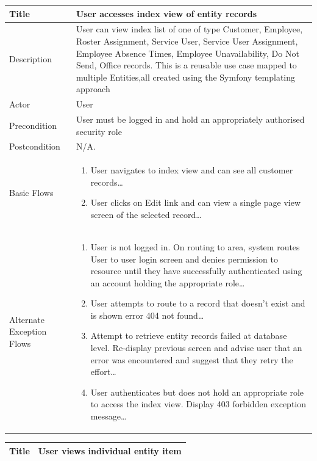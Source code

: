 \documentclass[a4paper,Times New Roman 11pt]{article}
\newcommand\addrow[2]{#1 &#2\\ }
\newcommand\addheading[2]{#1 &#2\\ \hline}
\newcommand\tabularhead{\begin{tabular}{lp{9cm}}
\hline
}
\newcommand\addmulrow[2]{ \begin{minipage}[t][][t]{3cm}#1\end{minipage}%
   &\begin{minipage}[t][][t]{9cm}
    \begin{enumerate} #2   \end{enumerate}
    \end{minipage}\\ }
\newenvironment{usecase}{\tabularhead}
{\hline\end{tabular}}
\begin{document}
\begin{samepage}
\begin{usecase}
\end{usecase}

\begin{usecase}

    \addheading{Title}{User accesses index view of entity records }
  \addheading{Description}{User can view index list of one of type Customer, Employee, Roster Assignment, Service User, Service User Assignment, Employee Absence Times, Employee Unavailability, Do Not Send, Office records. This is a reusable use case mapped to multiple Entities,all created using the Symfony templating approach}
  \addheading{Actor}{User} 
  \addrow{Precondition}{User must be logged in and hold an appropriately authorised security role}
  \addrow{Postcondition}{N/A.}
  \addmulrow{Basic Flows}{\item User navigates to index view and can see all customer records\ldots
                                  \item User clicks on Edit link and can view a single page view screen of the selected record\ldots}
  \addmulrow{Alternate Exception Flows}{\item User is not logged in. On routing to area, system routes User to user login screen and denies permission to resource until they have successfully authenticated using an account holding the appropriate  role\ldots
                                   \item User attempts to route to a record that doesn't exist and is shown error 404 not found\ldots
                                   \item Attempt to retrieve entity records failed at database level. Re-display previous screen and advise user that an error was encountered and suggest that they retry the effort\ldots
                                   \item User authenticates but does not hold an appropriate role to access the index view. Display 403 forbidden exception message\ldots}

\end{usecase}

\begin{usecase}
    \addheading{Title}{User views individual entity item}


\end{usecase}
\end{samepage}
\end{document}
